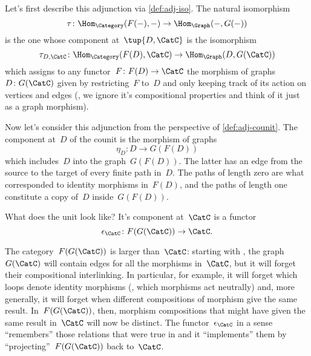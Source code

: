 Let's first describe this adjunction via \cref{def:adj-iso}. The natural isomorphism
\begin{equation*}
  \tau\colon \Hom_{\Category}(F(- ), - ) \to \Hom_{\Graph}(- , G( - ))
\end{equation*}
is the one whose component at~$\tup{D,\CatC}$ is the isomorphism
\begin{equation*}
  \tau_{D,\CatC} \colon \Hom_{\Category}(F(D), \CatC) \to \Hom_{\Graph}(D, G(\CatC))
\end{equation*}
which assigns to any functor~$F\colon F(D) \to \CatC$ the morphism of graphs~$D \colon G(\CatC)$ given by restricting~$F$ to~$D$ and only keeping track of its action on vertices and edges (\ie , we ignore it's compositional properties and think of it just as a graph morphism).

Now let's consider this adjunction from the perspective of \cref{def:adj-counit}. The component at~$D$ of the counit is the morphism of graphs
\begin{equation*}
  \eta_D \colon D \to  G(F(D))
\end{equation*}
which includes~$D$ into the graph~$G(F(D))$. The latter has an edge from the source to the target of every finite path in~$D$. The paths of length zero are what corresponded to identity morphisms in~$F(D)$, and the paths of length one constitute a copy of~$D$ inside~$G(F(D))$.

What does the unit look like? It's component at~$\CatC$ is a functor
\begin{equation*}
  \epsilon_{\CatC} \colon F(G(\CatC)) \to \CatC.
\end{equation*}

The category~$F(G(\CatC))$ is larger than~$\CatC$: starting with \CatC, the graph~$G(\CatC)$ will contain edges for all the morphisms in~$\CatC$, but it will forget their compositional interlinking. In particular, for example, it will forget which loops denote identity morphisms (\ie , which morphisms act neutrally) and, more generally, it will forget when different compositions of morphism give the same result. In~$F(G(\CatC))$, then, morphism compositions that might have given the same result in~$\CatC$ will now be distinct.
The functor~$\epsilon_{\CatC}$ in a sense ``remembers'' those relations that were true in \CatC and it ``implements'' them by ``projecting''~$F(G(\CatC))$ back to~$\CatC$.

